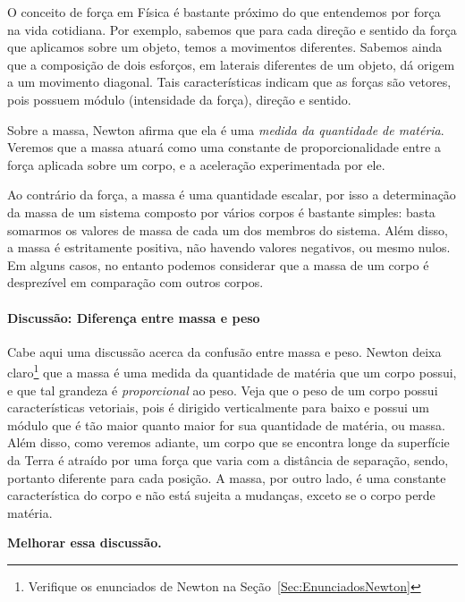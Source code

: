 \noindent{}O conceito de força em Física é bastante próximo do que entendemos por força na vida cotidiana. Por exemplo, sabemos que para cada direção e sentido da força que aplicamos sobre um objeto, temos a movimentos diferentes. Sabemos ainda que a composição de dois esforços, em laterais diferentes de um objeto, dá origem a um movimento diagonal. Tais características indicam que as forças são vetores, pois possuem módulo (intensidade da força), direção e sentido.

Sobre a massa, Newton afirma que ela é uma \emph{medida da quantidade de matéria}. Veremos que a massa atuará como uma constante de proporcionalidade entre a força aplicada sobre um corpo, e a aceleração experimentada por ele.

Ao contrário da força, a massa é uma quantidade escalar, por isso a determinação da massa de um sistema composto por vários corpos é bastante simples: basta somarmos os valores de massa de cada um dos membros do sistema. Além disso, a massa é estritamente positiva, não havendo valores negativos, ou mesmo nulos. Em alguns casos, no entanto podemos considerar que a massa de um corpo é desprezível em comparação com outros corpos.

\paragraph{Discussão: Diferença entre massa e peso}

Cabe aqui uma discussão acerca da confusão entre massa e peso. Newton deixa claro\footnote{Verifique os enunciados de Newton na Seção~\ref{Sec:EnunciadosNewton}} que a massa é uma medida da quantidade de matéria que um corpo possui, e que tal grandeza é \emph{proporcional} ao peso. Veja que o peso de um corpo possui características vetoriais, pois é dirigido verticalmente para baixo e possui um módulo que é tão maior quanto maior for sua quantidade de matéria, ou massa. Além disso, como veremos adiante, um corpo que se encontra longe da superfície da Terra é atraído por uma força que varia com a distância de separação, sendo, portanto diferente para cada posição. A massa, por outro lado, é uma constante característica do corpo e não está sujeita a mudanças, exceto se o corpo perde matéria.

\textbf{Melhorar essa discussão.}

